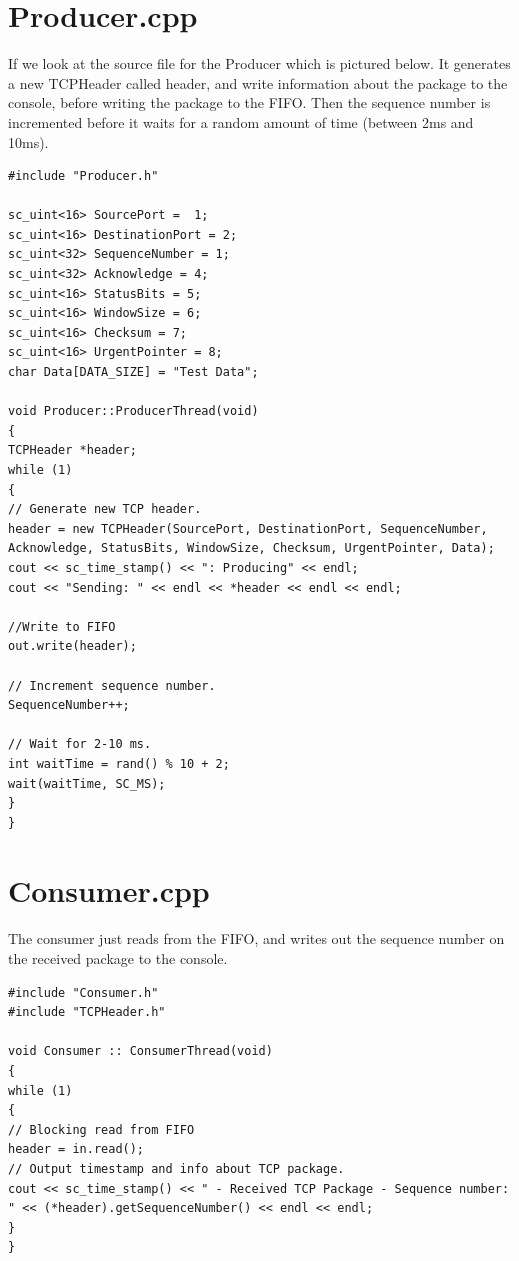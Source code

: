 \section{Producer.cpp}

If we look at the source file for the Producer which is pictured below. 
It generates a new TCPHeader called header, and write information about the package to the console, before writing the package to the FIFO. Then the sequence number is incremented before it waits for a random amount of time (between 2ms and 10ms). 

\begin{lstlisting}
#include "Producer.h"

sc_uint<16> SourcePort =  1;
sc_uint<16> DestinationPort = 2;
sc_uint<32> SequenceNumber = 1;
sc_uint<32> Acknowledge = 4;
sc_uint<16> StatusBits = 5;
sc_uint<16> WindowSize = 6;
sc_uint<16> Checksum = 7;
sc_uint<16> UrgentPointer = 8;
char Data[DATA_SIZE] = "Test Data";

void Producer::ProducerThread(void)
{
TCPHeader *header;
while (1)
{
// Generate new TCP header.
header = new TCPHeader(SourcePort, DestinationPort, SequenceNumber, Acknowledge, StatusBits, WindowSize, Checksum, UrgentPointer, Data);
cout << sc_time_stamp() << ": Producing" << endl;
cout << "Sending: " << endl << *header << endl << endl;

//Write to FIFO
out.write(header);

// Increment sequence number.
SequenceNumber++;

// Wait for 2-10 ms.
int waitTime = rand() % 10 + 2;
wait(waitTime, SC_MS);
}
}
\end{lstlisting}



\section{Consumer.cpp}
The consumer just reads from the FIFO, and writes out the sequence number on the received package to the console. 
\begin{lstlisting}
#include "Consumer.h"
#include "TCPHeader.h"

void Consumer :: ConsumerThread(void)
{
while (1)
{
// Blocking read from FIFO
header = in.read();
// Output timestamp and info about TCP package.
cout << sc_time_stamp() << " - Received TCP Package - Sequence number: " << (*header).getSequenceNumber() << endl << endl;
}
}
\end{lstlisting}



